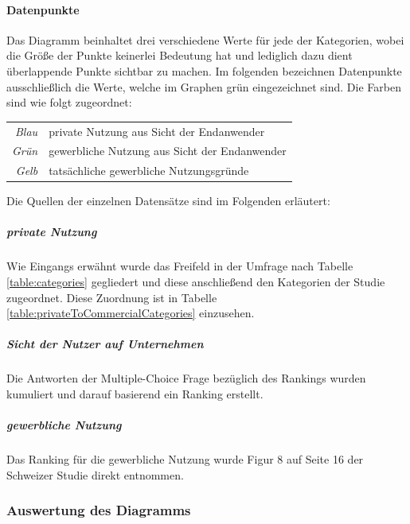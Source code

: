 \documentclass[a4paper]{article}
\begin{document}
                \paragraph{Datenpunkte}
                    Das Diagramm beinhaltet drei verschiedene Werte für jede der Kategorien, wobei die Größe der Punkte keinerlei Bedeutung hat und lediglich dazu dient überlappende Punkte sichtbar zu machen. Im folgenden bezeichnen Datenpunkte ausschließlich die Werte, welche im Graphen grün eingezeichnet sind. Die Farben sind wie folgt zugeordnet:\\
                    \begin{table}[H]
                        \centering
                        \bgroup
                        \def\arraystretch{1.5}
                        \begin{tabular}{ r | l }
                            \emph{Blau} & private Nutzung aus Sicht der Endanwender\\
                            \emph{Grün} & gewerbliche Nutzung aus Sicht der Endanwender\\
                            \emph{Gelb} & tatsächliche gewerbliche Nutzungsgründe
                        \end{tabular}
                        \egroup
                    \end{table}
                    
                    Die Quellen der einzelnen Datensätze sind im Folgenden erläutert:
                    \subparagraph{private Nutzung} Wie Eingangs erwähnt wurde das Freifeld in der Umfrage nach Tabelle \ref{table:categories} gegliedert und diese anschließend den Kategorien der Studie zugeordnet. Diese Zuordnung ist in Tabelle \ref{table:privateToCommercialCategories} einzusehen.
                    
                    \subparagraph{Sicht der Nutzer auf Unternehmen} Die Antworten der Multiple-Choice Frage bezüglich des Rankings wurden kumuliert und darauf basierend ein Ranking erstellt.
                    
                    \subparagraph{gewerbliche Nutzung} Das Ranking für die gewerbliche Nutzung wurde Figur 8 auf Seite 16 der Schweizer Studie\cite{oss:studie} direkt entnommen.
            
            \subsubsection{Auswertung des Diagramms}
\end{document}
